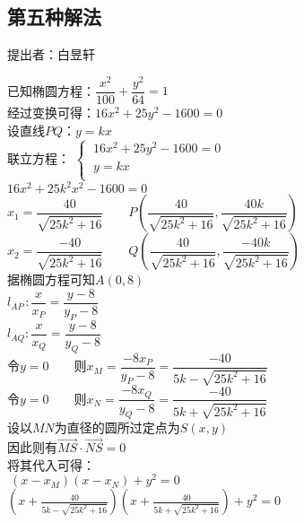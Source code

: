 \documentclass[UTF8]{ctexart}
\begin{document}
\subsection{第五种解法}
    \begin{center}
        提出者：白昱轩
    \end{center}
    \begin{multicols}{2}
        \small
        已知椭圆方程：$\dfrac{x^2}{100} + \dfrac{y^2}{64}=1$\\[5mm]
        经过变换可得：$16x^2+25y^2-1600=0$\\[5mm]
        设直线$PQ$：$y=kx$\\[5mm]
        联立方程：
        \begin{math}
            \begin{cases}
                ~16x^2+25y^2-1600=0\\[1mm]
                ~y=kx\\[1mm]
            \end{cases}
        \end{math}\\[5mm]
        $16x^2+25k^2x^2-1600=0$\\[5mm]
        $x_1=\dfrac{40}{\sqrt{25k^2+16}}$~~~~$P\left(\dfrac{40}{\sqrt{25k^2+16}},\dfrac{40k}{\sqrt{25k^2+16}}\right)$\\[5mm]
        $x_2=\dfrac{-40}{\sqrt{25k^2+16}}$~~~~$Q\left(\dfrac{40}{\sqrt{25k^2+16}},\dfrac{-40k}{\sqrt{25k^2+16}}\right)$\\[8mm]
        据椭圆方程可知$A(0,8)$\\[5mm]
        $l_{AP\,}:\dfrac{x}{x_P}=\dfrac{y-8}{y_P-8}$\\[5mm]
        $l_{AQ}:\dfrac{x}{x_Q}=\dfrac{y-8}{y_Q-8}$\\[8mm]
        令$y=0$~~~~则$x_M=\dfrac{-8x_P}{y_P-8}=\dfrac{-40}{5k-\sqrt{25k^2+16}}$\\[5mm]
        令$y=0$~~~~则$x_N=\dfrac{-8x_Q}{y_Q-8}=\dfrac{-40}{5k+\sqrt{25k^2+16}}$\\[80mm]
        设以$MN$为直径的圆所过定点为$S(x,y)$\\[5mm]
        因此则有$\overrightarrow{MS}\cdot\overrightarrow{NS}=0$\\[5mm]
        将其代入可得：\\[3mm]
        $~\left(x-x_M\right)\left(x-x_N\right)+y^2=0$\\[5mm]
        $\left(x+\frac{40}{5k-\sqrt{25k^2+16}}\right)\left(x+\frac{40}{5k+\sqrt{25k^2+16}}\right)+y^2=0$\\[8mm]

\end{multicols}
\end{document}
